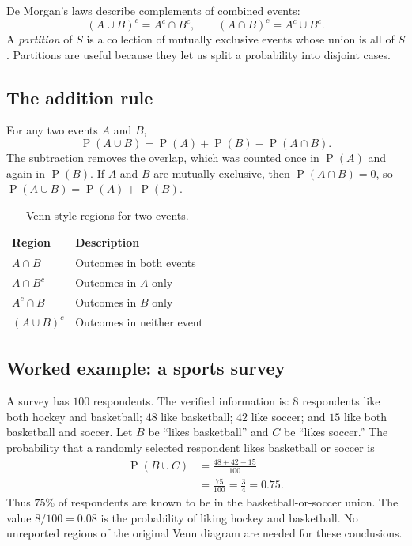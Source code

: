 \documentclass[11pt]{article}
\newcommand{\Pp}{\operatorname{P}}
\begin{document}
De Morgan's laws describe complements of combined events:
\[
(A\cup B)^c=A^c\cap B^c,
\qquad
(A\cap B)^c=A^c\cup B^c.
\]
A \emph{partition} of $S$ is a collection of mutually exclusive events whose
union is all of $S$.  Partitions are useful because they let us split a
probability into disjoint cases.

\subsection{The addition rule}
For any two events $A$ and $B$,
\[
\Pp(A\cup B)=\Pp(A)+\Pp(B)-\Pp(A\cap B).
\]
The subtraction removes the overlap, which was counted once in $\Pp(A)$ and
again in $\Pp(B)$.  If $A$ and $B$ are mutually exclusive, then
$\Pp(A\cap B)=0$, so $\Pp(A\cup B)=\Pp(A)+\Pp(B)$.

\begin{table}[ht]
\centering
\caption{Venn-style regions for two events.}\label{tab:venn-regions}
\begin{tabularx}{\textwidth}{@{}lY@{}}
\toprule
Region & Description \\
\midrule
$A\cap B$ & Outcomes in both events \\
$A\cap B^c$ & Outcomes in $A$ only \\
$A^c\cap B$ & Outcomes in $B$ only \\
$(A\cup B)^c$ & Outcomes in neither event \\
\bottomrule
\end{tabularx}
\end{table}

\subsection{Worked example: a sports survey}
A survey has $100$ respondents.  The verified information is: $8$ respondents
like both hockey and basketball; $48$ like basketball; $42$ like soccer; and
$15$ like both basketball and soccer.  Let $B$ be ``likes basketball'' and $C$
be ``likes soccer.''  The probability that a randomly selected respondent likes
basketball or soccer is
\begin{align*}
\Pp(B\cup C)&=\frac{48+42-15}{100}\\
&=\frac{75}{100}=\frac{3}{4}=0.75.
\end{align*}
Thus $75\%$ of respondents are known to be in the basketball-or-soccer union.
The value $8/100=0.08$ is the probability of liking hockey and basketball.  No
unreported regions of the original Venn diagram are needed for these conclusions.
\end{document}
